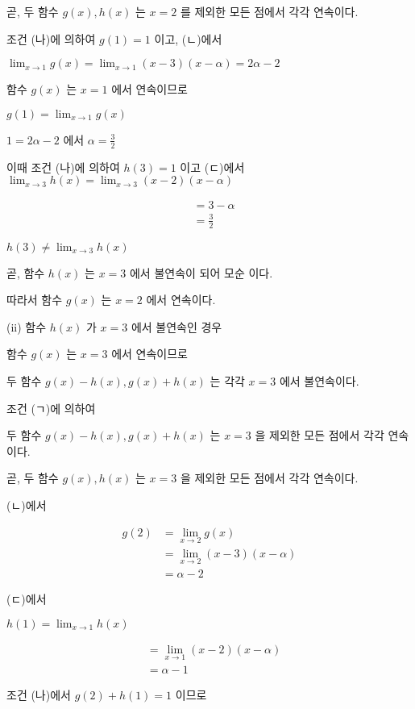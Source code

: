 \documentclass[10pt]{article}
\begin{document}
곧, 두 함수 \(g(x), h(x)\) 는 \(x=2\) 를 제외한 모든 점에서 각각 연속이다.

조건 (나)에 의하여 \(g(1)=1\) 이고, (ㄴ)에서

\(\lim _{x \rightarrow 1} g(x)=\lim _{x \rightarrow 1}(x-3)(x-\alpha)=2 \alpha-2\)

함수 \(g(x)\) 는 \(x=1\) 에서 연속이므로

\(g(1)=\lim _{x \rightarrow 1} g(x)\)

\(1=2 \alpha-2\) 에서 \(\alpha=\frac{3}{2}\)

이때 조건 (나)에 의하여 \(h(3)=1\) 이고 (ㄷ)에서 \(\lim _{x \rightarrow 3} h(x)=\lim _{x \rightarrow 3}(x-2)(x-\alpha)\)

\[
\begin{aligned}
& =3-\alpha \\
& =\frac{3}{2}
\end{aligned}
\]

\(h(3) \neq \lim _{x \rightarrow 3} h(x)\)

곧, 함수 \(h(x)\) 는 \(x=3\) 에서 불연속이 되어 모순 이다.

따라서 함수 \(g(x)\) 는 \(x=2\) 에서 연속이다.

(ii) 함수 \(h(x)\) 가 \(x=3\) 에서 불연속인 경우

함수 \(g(x)\) 는 \(x=3\) 에서 연속이므로

두 함수 \(g(x)-h(x), g(x)+h(x)\) 는 각각 \(x=3\) 에서 불연속이다.

조건 (ㄱ)에 의하여

두 함수 \(g(x)-h(x), g(x)+h(x)\) 는 \(x=3\) 을 제외한 모든 점에서 각각 연속이다.

곧, 두 함수 \(g(x), h(x)\) 는 \(x=3\) 을 제외한 모든 점에서 각각 연속이다.

(ㄴ)에서

\[
\begin{aligned}
g(2) & =\lim _{x \rightarrow 2} g(x) \\
& =\lim _{x \rightarrow 2}(x-3)(x-\alpha) \\
& =\alpha-2
\end{aligned}
\]

(ㄷ)에서

\(h(1)=\lim _{x \rightarrow 1} h(x)\)

\[
\begin{aligned}
& =\lim _{x \rightarrow 1}(x-2)(x-\alpha) \\
& =\alpha-1
\end{aligned}
\]

조건 (나)에서 \(g(2)+h(1)=1\) 이므로
\end{document}
